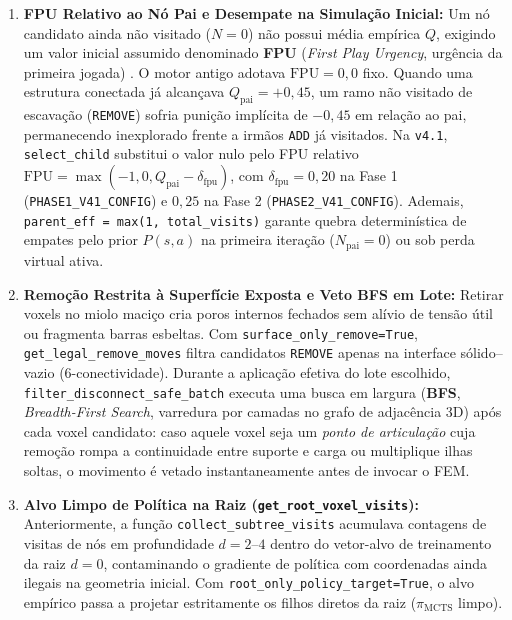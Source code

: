 \documentclass[11pt,a4paper]{article}
\begin{document}
\begin{enumerate}
  \item \textbf{FPU Relativo ao Nó Pai e Desempate na Simulação Inicial:} Um nó candidato ainda não visitado ($N = 0$) não possui média empírica $Q$, exigindo um valor inicial assumido denominado \textbf{FPU} (\textit{First Play Urgency}, urgência da primeira jogada) \cite{browne2012survey, wu2019accelerating}. O motor antigo adotava $\mathrm{FPU} = 0{,}0$ fixo. Quando uma estrutura conectada já alcançava $Q_{\mathrm{pai}} = +0{,}45$, um ramo não visitado de escavação (\texttt{REMOVE}) sofria punição implícita de $-0{,}45$ em relação ao pai, permanecendo inexplorado frente a irmãos \texttt{ADD} já visitados. Na \texttt{v4.1}, \texttt{select\_child} substitui o valor nulo pelo FPU relativo $\mathrm{FPU} = \max(-1{,}0, Q_{\mathrm{pai}} - \delta_{\mathrm{fpu}})$, com $\delta_{\mathrm{fpu}} = 0{,}20$ na Fase 1 (\texttt{PHASE1\_V41\_CONFIG}) e $0{,}25$ na Fase 2 (\texttt{PHASE2\_V41\_CONFIG}). Ademais, \texttt{parent\_eff = max(1, total\_visits)} garante quebra determinística de empates pelo prior $P(s,a)$ na primeira iteração ($N_{\mathrm{pai}} = 0$) ou sob perda virtual ativa.

  \item \textbf{Remoção Restrita à Superfície Exposta e Veto BFS em Lote:} Retirar voxels no miolo maciço cria poros internos fechados sem alívio de tensão útil ou fragmenta barras esbeltas. Com \texttt{surface\_only\_remove=True}, \texttt{get\_legal\_remove\_moves} filtra candidatos \texttt{REMOVE} apenas na interface sólido--vazio (6-conectividade). Durante a aplicação efetiva do lote escolhido, \texttt{filter\_disconnect\_safe\_batch} executa uma busca em largura (\textbf{BFS}, \textit{Breadth-First Search}, varredura por camadas no grafo de adjacência 3D) após cada voxel candidato: caso aquele voxel seja um \textit{ponto de articulação} cuja remoção rompa a continuidade entre suporte e carga ou multiplique ilhas soltas, o movimento é vetado instantaneamente antes de invocar o FEM.

  \item \textbf{Alvo Limpo de Política na Raiz (\texttt{get\_root\_voxel\_visits}):} Anteriormente, a função \texttt{collect\_subtree\_visits} acumulava contagens de visitas de nós em profundidade $d = 2\text{--}4$ dentro do vetor-alvo de treinamento da raiz $d = 0$, contaminando o gradiente de política \cite{huang2022closer} com coordenadas ainda ilegais na geometria inicial. Com \texttt{root\_only\_policy\_target=True}, o alvo empírico passa a projetar estritamente os filhos diretos da raiz ($\pi_{\mathrm{MCTS}}$ limpo).


\end{enumerate}
\end{document}
